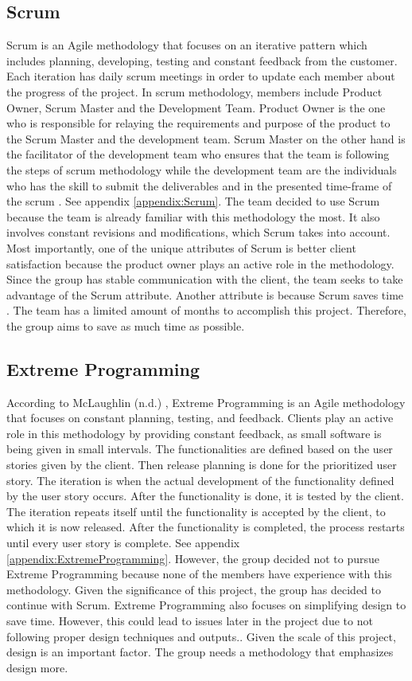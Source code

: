 \subsection{Scrum}
Scrum is an Agile methodology that focuses on an iterative pattern which includes planning, developing, testing and constant feedback from the customer. Each iteration has daily scrum meetings in order to update each member about the progress of the project. In scrum methodology, members include Product Owner, Scrum Master and the Development Team. Product Owner is the one who is responsible for relaying the requirements and purpose of the product to the Scrum Master and the development team. Scrum Master on the other hand is the facilitator of the development team who ensures that the team is following the steps of scrum methodology while the development team are the individuals who has the skill to submit the deliverables and in the presented time-frame of the scrum \cite{ref:ScrumMethodology}. See appendix \ref{appendix:Scrum}. The team decided to use Scrum because the team is already familiar with this methodology the most. It also involves constant revisions and modifications, which Scrum takes into account. Most importantly, one of the unique attributes of Scrum is better client satisfaction because the product owner plays an active role in the methodology. Since the group has stable communication with the client, the team seeks to take advantage of the Scrum attribute. Another attribute is because Scrum saves time \cite{ref:ReasonsScrum}. The team has a limited amount of months to accomplish this project. Therefore, the group aims to save as much time as possible.

\subsection{Extreme Programming}
According to McLaughlin (n.d.) \nocite{ref:ExtremeProgramming}, Extreme Programming is an Agile methodology that focuses on constant planning, testing, and feedback. Clients play an active role in this methodology by providing constant feedback, as small software is being given in small intervals. The functionalities are defined based on the user stories given by the client. Then release planning is done for the prioritized user story. The iteration is when the actual development of the functionality defined by the user story occurs. After the functionality is done, it is tested by the client. The iteration repeats itself until the functionality is accepted by the client, to which it is now released. After the functionality is completed, the process restarts until every user story is complete. See appendix \ref{appendix:ExtremeProgramming}. However, the group decided not to pursue Extreme Programming because none of the members have experience with this methodology. Given the significance of this project, the group has decided to continue with Scrum. Extreme Programming also focuses on simplifying design to save time. However, this could lead to issues later in the project due to not following proper design techniques and outputs.\cite{ref:ExtremeProgrammingDisadvantage}. Given the scale of this project, design is an important factor. The group needs a methodology that emphasizes design more.

